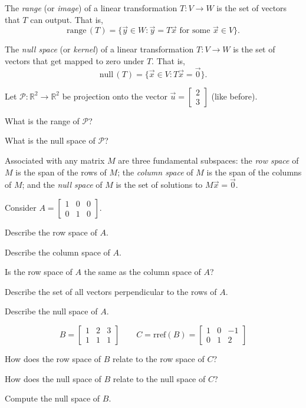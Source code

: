 \documentclass[14pt]{problemset}
\newcommand{\R}{\mathbb{R}}
\newcommand{\Null}{\mathrm{null}\,}
\newcommand{\Range}{\mathrm{range}\,}
\newcommand{\rref}{\mathrm{rref}}
\newcommand{\mat}[1]{\begin{bmatrix}#1\end{bmatrix}}
\begin{document}
\newpage
	\begin{definition}[Range]
		The \emph{range} (or \emph{image}) of a linear transformation $T:V\to W$ is the set of vectors that
		$T$ can output.  That is,
		\[
			\Range(T)=\{\vec y\in W:\vec y=T\vec x\text{ for some }\vec x\in V\}.
		\]
	\end{definition}
	\begin{definition}
		The \emph{null space} (or \emph{kernel}) of a linear transformation $T:V\to W$ is the
		set of vectors that get mapped to zero under $T$.  That is,
		\[
			\Null(T)=\{\vec x\in V:T\vec x=\vec 0\}.
		\]
	\end{definition}

	\question
	Let $\mathcal P:\R^2\to\R^2$ be projection onto the vector $\vec u=\mat{2\\3}$ (like before).
	\begin{parts}
		\item What is the range of $\mathcal P$?
		\item What is the null space of $\mathcal P$?
	\end{parts}


	\begin{definition}
		Associated with any matrix $M$ are three fundamental subspaces: the \emph{row space}
		of $M$ is the span of the rows of $M$; the \emph{column space} of $M$ is the span
		of the columns of $M$; and the \emph{null space} of $M$ is the set of solutions
		to $M\vec x=\vec 0$. 
		
	\end{definition}

	\question
	Consider $A=\mat{1&0&0\\0&1&0}$.
	\begin{parts}
		\item Describe the row space of $A$.
		\item Describe the column space of $A$.
		\item Is the row space of $A$ the same as the column space of $A$?
		\item Describe the set of all vectors perpendicular to the rows of $A$.
		\item Describe the null space of $A$.
	\end{parts}

	\question
	\[
		B=\mat{1&2&3\\1&1&1}\qquad C=\rref(B)=\mat{1&0&-1\\0&1&2}
	\]
	\begin{parts}
		\item How does the row space of $B$ relate to the row space of $C$?
		\item How does the null space of $B$ relate to the null space of $C$?
		\item Compute the null space of $B$.
	\end{parts}
\end{document}
